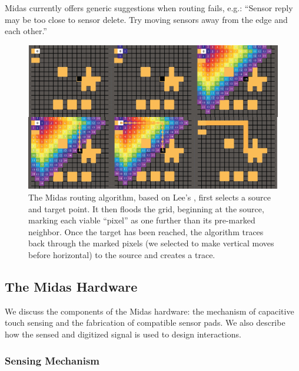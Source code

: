 Midas currently offers generic suggestions when routing fails,
e.g.: “Sensor reply may be too close to sensor delete. Try
moving sensors away from the edge and each other.”

\begin{figure}[t]
\centering
\includegraphics[width=\textwidth]{figures/midas/routing.png}
\caption{The Midas routing algorithm, based on Lee's \cite{lee-maze}, first selects a source and target point. It then floods the grid, beginning at the source, marking each viable ``pixel'' as one further than its pre-marked neighbor. Once the target has been reached, the algorithm traces back through the marked pixels (we selected to make vertical moves before horizontal) to the source and creates a trace.} 
\label{fig:midas-routing}
\end{figure}


    \subsection{The Midas Hardware}

We discuss the components of the Midas hardware: the mechanism of capacitive touch sensing and the fabrication of compatible sensor pads. We also describe how the sensed and digitized signal is used to design interactions.

    \subsubsection{Sensing Mechanism}


